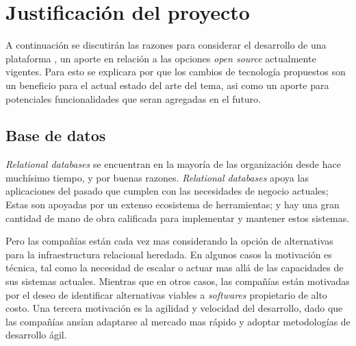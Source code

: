 
\chapter{Justificación del proyecto}\label{cap:justificacion_proyecto}


A continuación se discutirán las razones para considerar el desarrollo de una plataforma , un aporte en relación a las opciones \textit{open source} actualmente vigentes. Para esto se explicara por que los cambios de tecnología propuestos son un beneficio para el actual estado del arte del tema, asi como un aporte para potenciales funcionalidades que seran agregadas en el futuro.

\section{Base de datos}

\textit{Relational databases} se encuentran en la mayoría de las organización desde hace muchísimo tiempo, y por buenas razones. \textit{Relational databases} apoya las aplicaciones del pasado que cumplen con las necesidades de negocio actuales; Estas son apoyadas por un extenso ecosistema de herramientas; y hay una gran cantidad de mano de obra calificada para implementar y mantener estos sistemas.

Pero las compañías están cada vez mas considerando la opción de alternativas para la infraestructura relacional heredada. En algunos casos la motivación es técnica, tal como la necesidad de escalar o actuar mas allá de las capacidades de sus sistemas actuales. Mientras que en otros casos, las compañías están motivadas por el deseo de identificar alternativas viables a \textit{softwares} propietario de alto costo. Una tercera motivación es la agilidad y velocidad del desarrollo, dado que las compañías ansían adaptarse al mercado mas rápido y adoptar metodologías de desarrollo ágil.

